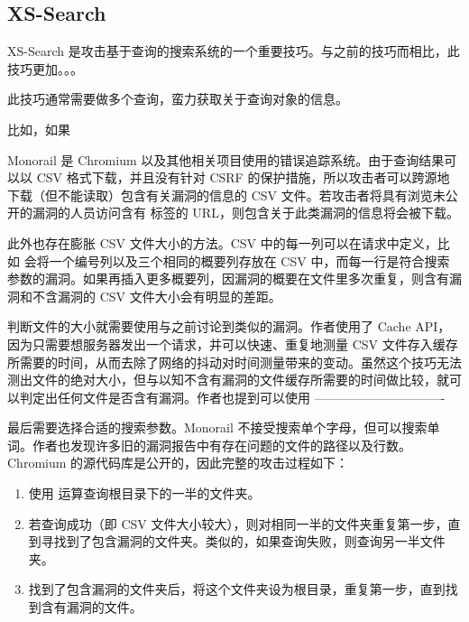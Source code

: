 \subsection{XS-Search}\label{sec:search}

XS-Search 是攻击基于查询的搜索系统的一个重要技巧。与之前的技巧而相比，此技巧更加。。。

此技巧通常需要做多个查询，蛮力获取关于查询对象的信息。

比如，如果

Monorail 是 Chromium 以及其他相关项目使用的错误追踪系统。由于查询结果可以以 CSV 格式下载，并且没有针对 CSRF 的保护措施，所以攻击者可以跨源地下载（但不能读取）包含有关漏洞的信息的 CSV 文件。若攻击者将具有浏览未公开的漏洞的人员访问含有  标签的 URL，则包含关于此类漏洞的信息将会被下载。

此外也存在膨胀 CSV 文件大小的方法。CSV 中的每一列可以在请求中定义，比如  会将一个编号列以及三个相同的概要列存放在 CSV 中，而每一行是符合搜索参数的漏洞。如果再插入更多概要列，因漏洞的概要在文件里多次重复，则含有漏洞和不含漏洞的 CSV 文件大小会有明显的差距。

判断文件的大小就需要使用与之前讨论到类似的漏洞。作者使用了 Cache API，因为只需要想服务器发出一个请求，并可以快速、重复地测量 CSV 文件存入缓存所需要的时间，从而去除了网络的抖动对时间测量带来的变动。虽然这个技巧无法测出文件的绝对大小，但与以知不含有漏洞的文件缓存所需要的时间做比较，就可以判定出任何文件是否含有漏洞。作者也提到可以使用 -------------------------------

最后需要选择合适的搜索参数。Monorail 不接受搜索单个字母，但可以搜索单词。作者也发现许多旧的漏洞报告中有存在问题的文件的路径以及行数。Chromium 的源代码库是公开的，因此完整的攻击过程如下：

\begin{enumerate}
    \item 使用  运算查询根目录下的一半的文件夹。
    \item 若查询成功（即 CSV 文件大小较大），则对相同一半的文件夹重复第一步，直到寻找到了包含漏洞的文件夹。类似的，如果查询失败，则查询另一半文件夹。
    \item 找到了包含漏洞的文件夹后，将这个文件夹设为根目录，重复第一步，直到找到含有漏洞的文件。
\end{enumerate}

